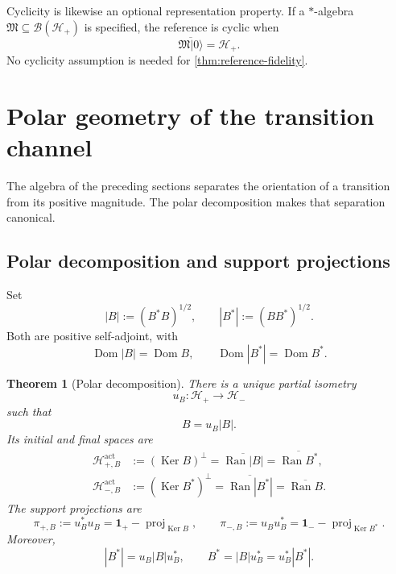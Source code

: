 \documentclass[11pt,reqno]{scrartcl}
\newcommand{\scrHp}{\mathscr H_{+}}
\newcommand{\scrHm}{\mathscr H_{-}}
\newcommand{\idop}{\mathbf 1}
\newcommand{\ket}[1]{\lvert #1\rangle}
\DeclareMathOperator{\Dom}{Dom}
\DeclareMathOperator{\Ran}{Ran}
\DeclareMathOperator{\Ker}{Ker}
\theoremstyle{plain}
\newtheorem{theorem}{Theorem}[section]
\theoremstyle{definition}
\theoremstyle{remark}
\begin{document}
Cyclicity is likewise an optional representation property.  If a
\(*\)-algebra \(\mathfrak M\subseteq\mathcal B(\scrHp)\) is specified, the
reference is cyclic when
\begin{equation}
  \overline{\mathfrak M\ket0}=\scrHp.
  \label{eq:cyclic-reference}
\end{equation}
No cyclicity assumption is needed for \cref{thm:reference-fidelity}.


\section{Polar geometry of the transition channel}
\label{sec:polar}

The algebra of the preceding sections separates the orientation of a
transition from its positive magnitude.  The polar decomposition makes that
separation canonical.

\subsection{Polar decomposition and support projections}

Set
\begin{equation}
  |B|:=(B^*B)^{1/2},
  \qquad
  |B^*|:=(BB^*)^{1/2}.
  \label{eq:moduli}
\end{equation}
Both are positive self-adjoint, with
\begin{equation}
  \Dom |B|=\Dom B,
  \qquad
  \Dom |B^*|=\Dom B^*.
\end{equation}

\begin{theorem}[Polar decomposition]
\label{thm:polar-decomposition}
There is a unique partial isometry
\begin{equation}
  u_B:\scrHp\longrightarrow\scrHm
\end{equation}
such that
\begin{equation}
  B=u_B|B|.
  \label{eq:polar-B}
\end{equation}
Its initial and final spaces are
\begin{align}
  \mathscr H_{+,B}^{\mathrm{act}}
  &:=(\Ker B)^\perp
  =\overline{\Ran |B|}
  =\overline{\Ran B^*},
  \label{eq:active-plus}\\
  \mathscr H_{-,B}^{\mathrm{act}}
  &:=(\Ker B^*)^\perp
  =\overline{\Ran |B^*|}
  =\overline{\Ran B}.
  \label{eq:active-minus}
\end{align}
The support projections are
\begin{equation}
  \pi_{+,B}:=u_B^*u_B
  =\idop_+-\operatorname{proj}_{\Ker B},
  \qquad
  \pi_{-,B}:=u_Bu_B^*
  =\idop_--\operatorname{proj}_{\Ker B^*}.
  \label{eq:support-sector}
\end{equation}
Moreover,
\begin{equation}
  |B^*|=u_B|B|u_B^*,
  \qquad
  B^*=|B|u_B^*=u_B^*|B^*|.
  \label{eq:polar-intertwining}
\end{equation}
\end{theorem}
\end{document}
